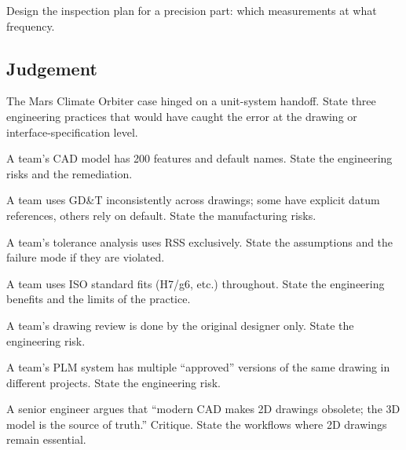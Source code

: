 \begin{exercise}
Design the inspection plan for a precision part: which measurements at what frequency.
\end{exercise}

\subsection*{Judgement}

\begin{exercise}
The Mars Climate Orbiter case \cite{acc:nasa-mco-mib} hinged on a unit-system handoff. State three engineering practices that would have caught the error at the drawing or interface-specification level.
\end{exercise}

\begin{exercise}
A team's CAD model has 200 features and default names. State the engineering risks and the remediation.
\end{exercise}

\begin{exercise}
A team uses GD\&T inconsistently across drawings; some have explicit datum references, others rely on default. State the manufacturing risks.
\end{exercise}

\begin{exercise}
A team's tolerance analysis uses RSS exclusively. State the assumptions and the failure mode if they are violated.
\end{exercise}

\begin{exercise}
A team uses ISO standard fits (H7/g6, etc.) throughout. State the engineering benefits and the limits of the practice.
\end{exercise}

\begin{exercise}
A team's drawing review is done by the original designer only. State the engineering risk.
\end{exercise}

\begin{exercise}
A team's PLM system has multiple ``approved'' versions of the same drawing in different projects. State the engineering risk.
\end{exercise}

\begin{exercise}
A senior engineer argues that ``modern CAD makes 2D drawings obsolete; the 3D model is the source of truth.'' Critique. State the workflows where 2D drawings remain essential.
\end{exercise}


